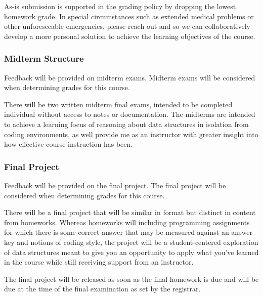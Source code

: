 \documentclass[11pt]{article}
\begin{document}
\bigskip
\noindent As-is submission is supported in the grading policy by dropping the lowest homework
grade. In special circumstances such as extended medical problems or other unforeseeable
emergencies, please reach out and so we can collaboratively develop a more personal
solution to achieve the learning objectives of the course.

\subsubsection*{Midterm Structure}

Feedback will be provided on midterm exams.  Midterm exams will be considered when determining grades for this course.

\bigskip
\noindent There will be two written midterm final exams, intended to be completed individual
without access to notes or documentation. The midterms are intended to achieve a learning
focus of reasoning about data structures in isolation from coding environments,
as well provide me as an instructor with greater insight into how effective course
instruction has been.

\subsubsection*{Final Project}

Feedback will be provided on the final project. The final project will be considered when determining grades for this course.


There will be a final project that will be similar in format but distinct in content from
homeworks. Whereas homeworks will including programming assignments for which there is
some correct answer that may be measured against an answer key and notions of coding
style, the project will be a student-centered exploration of data structures meant to
give you an opportunity to apply what you've learned in the course while still receiving
support from an instructor.

\bigskip
\noindent The final project will be released as soon as the final homework is due
 and will be due at the time of the final examination as set 
by the registrar.
\end{document}
